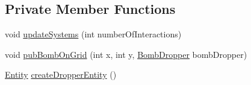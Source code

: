 \subsection*{Private Member Functions}
\begin{DoxyCompactItemize}
\item 
void \hyperlink{classbr_1_1unb_1_1unbomber_1_1systems_1_1_bomb_system_test_case_a18b11aa8f3c0b6920f191c04c40dfb05}{update\+Systems} (int number\+Of\+Interactions)
\item 
void \hyperlink{classbr_1_1unb_1_1unbomber_1_1systems_1_1_bomb_system_test_case_a1f2b1131d46f37204c88e5c3c00b7d60}{pub\+Bomb\+On\+Grid} (int x, int y, \hyperlink{classbr_1_1unb_1_1unbomber_1_1component_1_1_bomb_dropper}{Bomb\+Dropper} bomb\+Dropper)
\item 
\hyperlink{classbr_1_1unb_1_1unbomber_1_1core_1_1_entity}{Entity} \hyperlink{classbr_1_1unb_1_1unbomber_1_1systems_1_1_bomb_system_test_case_a694037ed26c8f6ac276ce779993ee5f1}{create\+Dropper\+Entity} ()
\end{DoxyCompactItemize}


